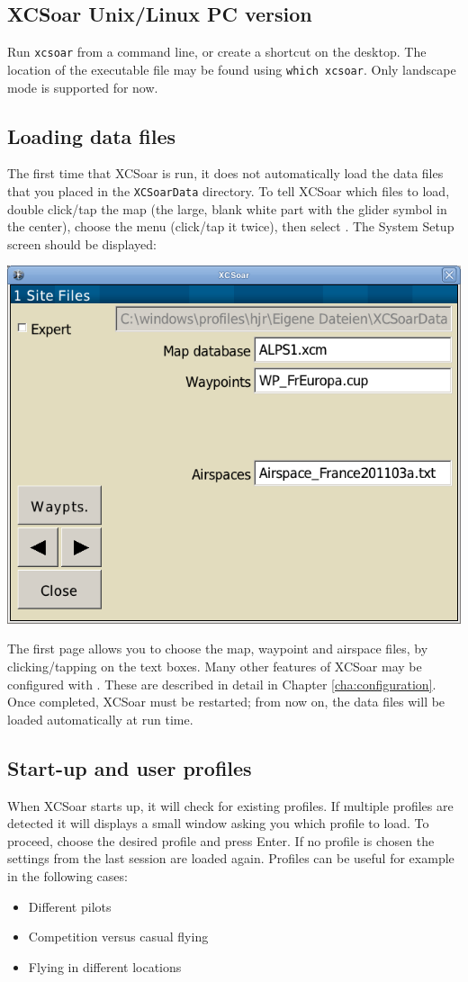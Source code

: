 \subsection*{XCSoar Unix/Linux PC version}
Run \verb|xcsoar| from a command line, or create a shortcut on the
desktop.  The location of the executable file may be found using
\verb|which xcsoar|.  Only landscape mode is  supported for now.

\subsection*{Loading data files}
The first time that XCSoar is run, it does not automatically load the 
data files that you placed in the \verb|XCSoarData| directory.  
To tell XCSoar which files to load, double click/tap the map (the large,
blank white part with the glider symbol in the center),
choose the menu  (click/tap it twice), then select
.  The System Setup screen should be displayed:
\begin{center}
\includegraphics[angle=0,width=0.8\linewidth,keepaspectratio='true']{figures/config-basic.png}
\end{center}
The first page allows you to choose the map, 
waypoint and airspace files, by clicking/tapping on the text boxes.
Many other features of XCSoar may be configured with
. These are described in detail in Chapter
\ref{cha:configuration}.
Once completed, XCSoar must be restarted; from now on, the data files
will be loaded automatically at run time.

\subsection*{Start-up and user profiles}
When XCSoar starts up, it will check for existing profiles. If multiple
profiles are detected it will displays a small window asking you which profile
to load. To proceed, choose the desired profile and press Enter. If no
profile is chosen the settings from the last session are loaded again. Profiles
can be useful for example in the following cases:
\begin{itemize}
\item Different pilots
\item Competition versus casual flying
\item Flying in different locations
\end{itemize}


